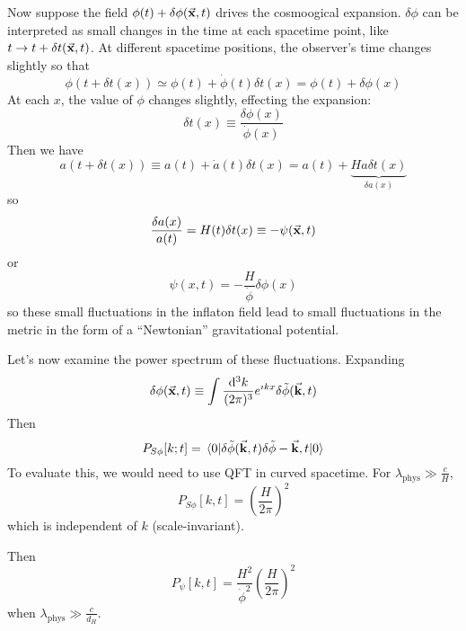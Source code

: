 \documentclass[a4paper,twoside,master.tex]{subfiles}
\begin{document}
Now suppose the field $ \phi(t) + \delta \phi(\va{x}, t) $ drives the cosmoogical expansion. $ \delta \phi $ can be interpreted as small changes in the time at each spacetime point, like $ t \to t + \delta t(\va{x}, t) $. At different spacetime positions, the observer's time changes slightly so that
\begin{equation}
    \phi(t + \delta t(x)) \simeq \phi(t) + \dot{\phi}(t) \delta t(x) = \phi(t) + \delta \phi(x)
\end{equation}
At each $ x $, the value of $\phi$ changes slightly, effecting the expansion:
\begin{equation}
    \delta t(x) \equiv \frac{\delta \phi(x)}{\dot{\phi}(x)}
\end{equation}
Then we have
\begin{equation}
    a(t + \delta t(x)) \equiv a(t) + \dot{a}(t) \delta t(x) = a(t) + \underbrace{H a \delta t(x)}_{\delta a(x)}
\end{equation}
so
\begin{equation}
    \frac{\delta a(x)}{a(t)} = H(t) \delta t(x) \equiv - \psi(\va{x}, t)
\end{equation}
or
\begin{equation}
    \psi(x,t) = - \frac{H}{\dot{\phi}} \delta \phi(x)
\end{equation}
so these small fluctuations in the inflaton field lead to small fluctuations in the metric in the form of a ``Newtonian'' gravitational potential.

Let's now examine the power spectrum of these fluctuations. Expanding
\begin{equation}
    \delta \phi(\va{x},t) \equiv \int \frac{\dd[3]{k}}{(2 \pi)^3} e^{\imath k x} \delta \tilde{\phi}(\va{k}, t)
\end{equation}
Then
\begin{equation}
    P_{S \phi} [k;t] = \mel{0}{\delta \tilde{\phi}(\va{k}, t) \delta \tilde{\phi} - \va{k}, t}{0}
\end{equation}
To evaluate this, we would need to use QFT in curved spacetime. For $ \lambda_{\text{phys}} \gg \frac{c}{H} $,
\begin{equation}
    P_{S \phi} [k,t] = \left( \frac{H}{2 \pi} \right)^2 \tag{Harrison-Zel'dovich}
\end{equation}
which is independent of $ k $ (scale-invariant).

Then
\begin{equation}
    P_{\psi} [k,t] = \frac{H^2}{\dot{\phi}^2} \left( \frac{H}{2 \pi} \right)^2    
\end{equation}
when $ \lambda_{\text{phys}} \gg \frac{c}{d_H} $.
\end{document}
